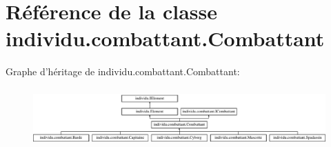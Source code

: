 \hypertarget{classindividu_1_1combattant_1_1_combattant}{\section{Référence de la classe individu.\-combattant.\-Combattant}
\label{classindividu_1_1combattant_1_1_combattant}
}
Graphe d'héritage de individu.\-combattant.\-Combattant\-:\begin{figure}[H]
\begin{center}
\leavevmode
\includegraphics[height=2.274112cm]{classindividu_1_1combattant_1_1_combattant}
\end{center}
\end{figure}
